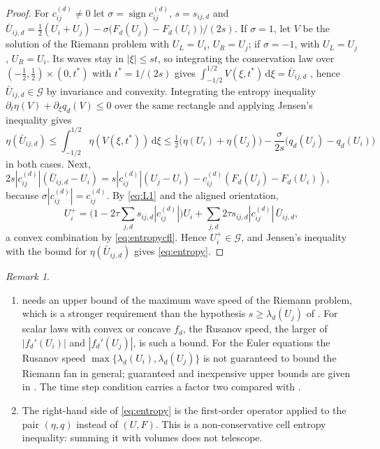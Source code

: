 \documentclass[11pt,a4paper]{article}
\theoremstyle{plain}
\theoremstyle{definition}
\theoremstyle{remark}
\newtheorem{remark}[theorem]{Remark}
\numberwithin{equation}{section}
\newcommand{\dd}{\mathrm{d}}
\newcommand{\Ad}{\mathcal{G}}
\newcommand{\sgn}{\operatorname{sign}}
\newcommand{\A}[1]{\cite[#1]{Addendum}}
\begin{document}
\begin{proof}
For $c^{(d)}_{ij}\ne0$ let $\sigma=\sgn c^{(d)}_{ij}$, $s=s_{ij,d}$ and $\bar U_{ij,d}=\tfrac12(U_i+U_j)-\sigma\big(F_d(U_j)-F_d(U_i)\big)/(2s)$. If $\sigma=1$, let $V$ be the solution of the Riemann problem with $U_L=U_i$, $U_R=U_j$; if $\sigma=-1$, with $U_L=U_j$, $U_R=U_i$. Its waves stay in $|\xi|\le st$, so integrating the conservation law over $(-\tfrac12,\tfrac12)\times(0,t^*)$ with $t^*=1/(2s)$ gives $\int_{-1/2}^{1/2}V(\xi,t^*)\,\dd\xi=\bar U_{ij,d}$ \cite{HLL1983}, hence $\bar U_{ij,d}\in\Ad$ by invariance and convexity. Integrating the entropy inequality $\partial_t\eta(V)+\partial_\xi q_d(V)\le0$ over the same rectangle and applying Jensen's inequality gives
\[
\eta(\bar U_{ij,d})\le\int_{-1/2}^{1/2}\eta(V(\xi,t^*))\,\dd\xi\le\tfrac12\big(\eta(U_i)+\eta(U_j)\big)-\frac{\sigma}{2s}\big(q_d(U_j)-q_d(U_i)\big)
\]
in both cases. Next, $2s|c^{(d)}_{ij}|(\bar U_{ij,d}-U_i)=s|c^{(d)}_{ij}|(U_j-U_i)-c^{(d)}_{ij}(F_d(U_j)-F_d(U_i))$, because $\sigma|c^{(d)}_{ij}|=c^{(d)}_{ij}$. By \eqref{eq:L1} and the aligned orientation,
\[
U_i^+=\Big(1-2\tau\sum_{j,d}s_{ij,d}|c^{(d)}_{ij}|\Big)U_i+\sum_{j,d}2\tau s_{ij,d}|c^{(d)}_{ij}|\,\bar U_{ij,d},
\]
a convex combination by \eqref{eq:entropycfl}. Hence $U_i^+\in\Ad$, and Jensen's inequality with the bound for $\eta(\bar U_{ij,d})$ gives \eqref{eq:entropy}.
\end{proof}

\begin{remark}\label{rem:entropy}
\begin{enumerate}[label=(\roman*)]
\item {} needs an upper bound of the maximum wave speed of the Riemann problem, which is a stronger requirement than the hypothesis $s\ge\lambda_d(U_j)$ of \A{Prop.~5.2}. For scalar laws with convex or concave $f_d$, the Rusanov speed, the larger of $|f_d'(U_i)|$ and $|f_d'(U_j)|$, is such a bound. For the Euler equations the Rusanov speed $\max\{\lambda_d(U_i),\lambda_d(U_j)\}$ is not guaranteed to bound the Riemann fan in general; guaranteed and inexpensive upper bounds are given in \cite{GuermondPopov2016JCP}. The time step condition carries a factor two compared with \A{(5.1)}.
\item The right-hand side of \eqref{eq:entropy} is the first-order operator applied to the pair $(\eta,q)$ instead of $(U,F)$. This is a non-conservative cell entropy inequality: summing it with volumes does not telescope.
\end{enumerate}
\end{remark}
\end{document}
